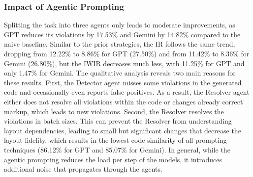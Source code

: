 \subsubsection{Impact of Agentic Prompting}
Splitting the task into three agents only leads to 
moderate improvements, as GPT reduces its violations 
by 17.53\% and Gemini by 14.82\% compared to the naive 
baseline. Similar to the prior strategies, the IR follows 
the same trend, dropping from 12.22\% to 8.86\% for GPT (27.50\%) and
from 11.42\% to 8.36\% for Gemini (26.80\%), but the IWIR decreases much less,
with 11.25\% for GPT and only 1.47\% for Gemini.\newline
The qualitative analysis reveals two main reasons for these 
results. First, the Detector agent misses some 
violations in the generated code and occasionally even reports 
false positives. As a result, the Resolver agent 
either does not resolve all violations within the code 
or changes already correct markup, which leads to new 
violations. Second, the Resolver resolves the violations in 
batch sizes. This can prevent the Resolver from understanding 
layout dependencies, leading to small but significant changes 
that decrease the layout fidelity, which results in the 
lowest code similarity of all prompting techniques
(86.12\% for GPT and 85.07\% for Gemini). In general, 
while the agentic prompting reduces the load per step of 
the models, it introduces additional noise that 
propagates through the agents.

